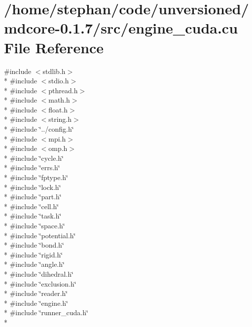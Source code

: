 \hypertarget{engine__cuda_8cu}{\section{/home/stephan/code/unversioned/mdcore-\/0.1.7/src/engine\-\_\-cuda.cu File Reference}
\label{engine__cuda_8cu}
}
{\ttfamily \#include $<$stdlib.\-h$>$}\\*
{\ttfamily \#include $<$stdio.\-h$>$}\\*
{\ttfamily \#include $<$pthread.\-h$>$}\\*
{\ttfamily \#include $<$math.\-h$>$}\\*
{\ttfamily \#include $<$float.\-h$>$}\\*
{\ttfamily \#include $<$string.\-h$>$}\\*
{\ttfamily \#include \char`\"{}../config.\-h\char`\"{}}\\*
{\ttfamily \#include $<$mpi.\-h$>$}\\*
{\ttfamily \#include $<$omp.\-h$>$}\\*
{\ttfamily \#include \char`\"{}cycle.\-h\char`\"{}}\\*
{\ttfamily \#include \char`\"{}errs.\-h\char`\"{}}\\*
{\ttfamily \#include \char`\"{}fptype.\-h\char`\"{}}\\*
{\ttfamily \#include \char`\"{}lock.\-h\char`\"{}}\\*
{\ttfamily \#include \char`\"{}part.\-h\char`\"{}}\\*
{\ttfamily \#include \char`\"{}cell.\-h\char`\"{}}\\*
{\ttfamily \#include \char`\"{}task.\-h\char`\"{}}\\*
{\ttfamily \#include \char`\"{}space.\-h\char`\"{}}\\*
{\ttfamily \#include \char`\"{}potential.\-h\char`\"{}}\\*
{\ttfamily \#include \char`\"{}bond.\-h\char`\"{}}\\*
{\ttfamily \#include \char`\"{}rigid.\-h\char`\"{}}\\*
{\ttfamily \#include \char`\"{}angle.\-h\char`\"{}}\\*
{\ttfamily \#include \char`\"{}dihedral.\-h\char`\"{}}\\*
{\ttfamily \#include \char`\"{}exclusion.\-h\char`\"{}}\\*
{\ttfamily \#include \char`\"{}reader.\-h\char`\"{}}\\*
{\ttfamily \#include \char`\"{}engine.\-h\char`\"{}}\\*
{\ttfamily \#include \char`\"{}runner\-\_\-cuda.\-h\char`\"{}}\\*
